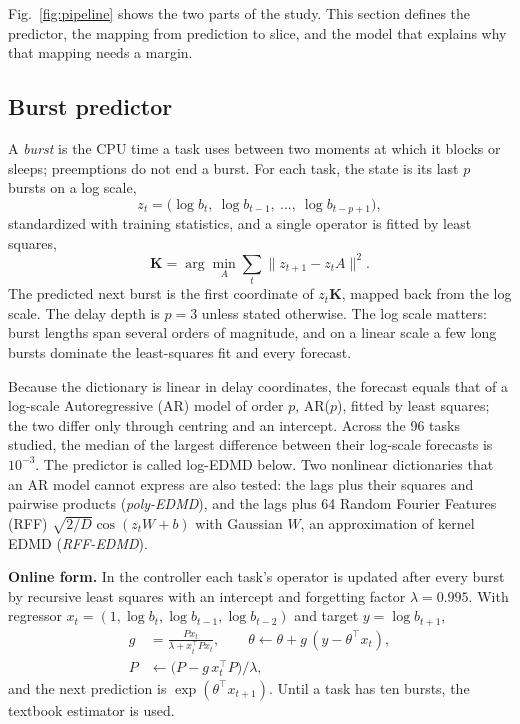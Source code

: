 \documentclass[conference,onecolumn,11pt]{IEEEtran}
\newcommand{\K}{\mathbf{K}}
\begin{document}
Fig.~\ref{fig:pipeline} shows the two parts of the study. This section defines the predictor, the mapping from prediction to slice, and the model that explains why that mapping needs a margin.

\subsection{Burst predictor}
A \emph{burst} is the CPU time a task uses between two moments at which it blocks or sleeps; preemptions do not end a burst. For each task, the state is its last $p$ bursts on a log scale,
\begin{equation}
z_t=\big(\log b_t,\ \log b_{t-1},\ \dots,\ \log b_{t-p+1}\big),
\end{equation}
standardized with training statistics, and a single operator is fitted by least squares,
\begin{equation}
\K=\arg\min_A\sum_t\|z_{t+1}-z_tA\|^2 .
\end{equation}
The predicted next burst is the first coordinate of $z_t\K$, mapped back from the log scale. The delay depth is $p=3$ unless stated otherwise. The log scale matters: burst lengths span several orders of magnitude, and on a linear scale a few long bursts dominate the least-squares fit and every forecast.

Because the dictionary is linear in delay coordinates, the forecast equals that of a log-scale Autoregressive (AR) model of order $p$, AR($p$), fitted by least squares; the two differ only through centring and an intercept. Across the 96 tasks studied, the median of the largest difference between their log-scale forecasts is $10^{-3}$. The predictor is called log-EDMD below. Two nonlinear dictionaries that an AR model cannot express are also tested: the lags plus their squares and pairwise products (\emph{poly-EDMD}), and the lags plus 64 Random Fourier Features (RFF) $\sqrt{2/D}\cos(z_tW+b)$ with Gaussian $W$, an approximation of kernel EDMD (\emph{RFF-EDMD}).

\textbf{Online form.} In the controller each task's operator is updated after every burst by recursive least squares with an intercept and forgetting factor $\lambda=0.995$. With regressor $x_t=(1,\log b_t,\log b_{t-1},\log b_{t-2})$ and target $y=\log b_{t+1}$,
\begin{align}
g&=\frac{P x_t}{\lambda+x_t^\top Px_t}, \qquad \theta \leftarrow \theta+g\,(y-\theta^\top x_t),\\
P&\leftarrow \big(P-g\,x_t^\top P\big)/\lambda ,
\end{align}
and the next prediction is $\exp(\theta^\top x_{t+1})$. Until a task has ten bursts, the textbook estimator is used.
\end{document}
